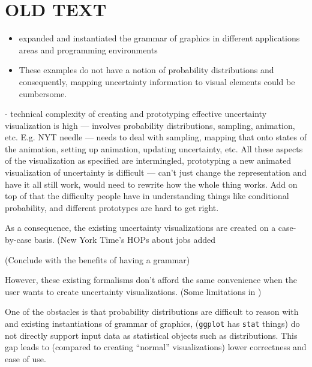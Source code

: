 \documentclass[11pt]{article}
\begin{document}
\pagebreak
\pagebreak


\section{OLD TEXT}

\begin{itemize}
    \item expanded and instantiated the grammar of graphics in different applications areas and programming environments \cite{Park2017,Satyanarayan2017, Wickham2010layered_grammar, yin_ggbio_2012} %
    \item These examples do not have a notion of probability distributions and consequently, mapping uncertainty information to visual elements could be cumbersome.
\end{itemize}

- technical complexity of creating and prototyping effective uncertainty visualization is high --- involves probability distributions, sampling, animation, etc. E.g. NYT needle --- needs to deal with sampling, mapping that onto states of the animation, setting up animation, updating uncertainty, etc. All these aspects of the visualization as specified are intermingled, prototyping a new animated visualization of uncertainty is difficult --- can't just change the representation and have it all still work, would need to rewrite how the whole thing works. Add on top of that the difficulty people have in understanding things like conditional probability, and different prototypes are hard to get right. 




As a consequence, the existing uncertainty visualizations are created on a case-by-case basis. (New York Time's HOPs about jobs added \cite{neil_irwin_how_2014}



(Conclude with the benefits of having a grammar)

However, these existing formalisms don’t afford the same convenience when the user wants to create uncertainty visualizations. (Some limitations in \cite{Wickham2010layered_grammar})

One of the obstacles is that probability distributions are difficult to reason with and existing instantiations of grammar of graphics, (\texttt{ggplot} has \texttt{stat} things) do not directly support input data as statistical objects such as distributions. This gap leads to (compared to creating ``normal'' visualizations) lower correctness and ease of use.
\end{document}

